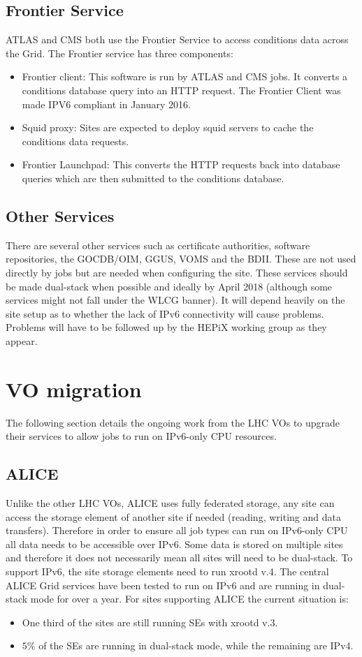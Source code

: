 \documentclass[a4paper]{jpconf}
\begin{document}
\subsection{Frontier Service}
ATLAS and CMS both use the Frontier Service\cite{Frontier} to access
conditions data across the Grid. The Frontier service has three
components:
\begin{itemize}
\item Frontier client: This software is run by ATLAS and CMS jobs. It
  converts a conditions database query into an HTTP request. The
  Frontier Client was made IPV6 compliant in January 2016.
\item Squid proxy: Sites are expected to deploy squid servers to cache
  the conditions data requests.
\item Frontier Launchpad: This converts the HTTP requests back into
  database queries which are then submitted to the conditions
  database.
\end{itemize}

\subsection{Other Services}
There are several other services such as certificate authorities,
software repositories, the GOCDB/OIM, GGUS, VOMS and the BDII. These
are not used directly by jobs but are needed when configuring the
site. These services should be made dual-stack when possible and
ideally by April 2018 (although some services might not fall under the
WLCG banner). It will depend heavily on the site setup as to whether
the lack of IPv6 connectivity will cause problems. Problems will have
to be followed up by the HEPiX working group as they appear.


\section{VO migration}
The following section details the ongoing work from the LHC VOs to
upgrade their services to allow jobs to run on IPv6-only CPU
resources.

\subsection{ALICE}
Unlike the other LHC VOs, ALICE uses fully federated storage, any site
can access the storage element of another site if needed (reading,
writing and data transfers). Therefore in order to ensure all job
types can run on IPv6-only CPU all data needs to be accessible over
IPv6. Some data is stored on multiple sites and therefore it does not
necessarily mean all sites will need to be dual-stack. To support
IPv6, the site storage elements need to run xrootd v.4. The central
ALICE Grid services have been tested to run on IPv6 and are running in
dual-stack mode for over a year. For sites supporting ALICE the
current situation is:
\begin{itemize}
\item One third of the sites are still running SEs with xrootd v.3.
\item $5\%$ of the SEs are running in dual-stack mode, while the
  remaining are IPv4.
\end{itemize}
\end{document}
